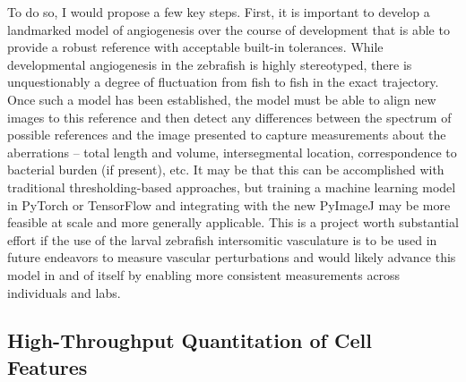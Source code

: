 To do so, I would propose a few key steps. First, it is important to develop a landmarked model of angiogenesis over the course of development that is able to provide a robust reference with acceptable built-in tolerances. While developmental angiogenesis in the zebrafish is highly stereotyped, there is unquestionably a degree of fluctuation from fish to fish in the exact trajectory. Once such a model has been established, the model must be able to align new images to this reference and then detect any differences between the spectrum of possible references and the image presented to capture measurements about the aberrations -- total length and volume, intersegmental location, correspondence to bacterial burden (if present), etc. It may be that this can be accomplished with traditional thresholding-based approaches, but training a machine learning model in PyTorch or TensorFlow and integrating with the new PyImageJ may be more feasible at scale and more generally applicable. This is a project worth substantial effort if the use of the larval zebrafish intersomitic vasculature is to be used in future endeavors to measure vascular perturbations and would likely advance this model in and of itself by enabling more consistent measurements across individuals and labs. 

\subsection{High-Throughput Quantitation of Cell Features}

